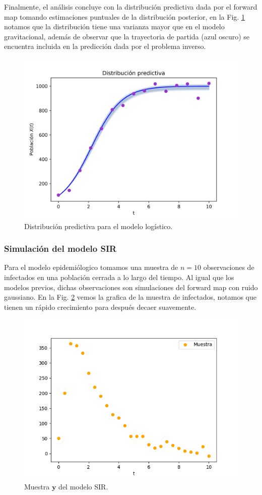 Finalmente, el análisis concluye con la distribución predictiva dada por el forward map tomando estimaciones puntuales de la distribución posterior, en la Fig. \ref{Fig. 3.2.log.predictiva} notamos que la distribución tiene una varianza mayor que en el modelo gravitacional, además de observar que la trayectoria de partida (azul oscuro) se encuentra incluida en la predicción dada por el problema inverso.

\begin{figure}
    \centering 
    \includegraphics[width = 10 cm ]{img/Exp_Central_logistico_sigma/Figuras/Generales/Predictiva_logistico_sigma.png} 
    \caption{Distribución predictiva para el modelo logístico.}
    \label{Fig. 3.2.log.predictiva}
\end{figure} 

\subsubsection{Simulación del modelo SIR}

Para el modelo epidemiólogico tomamos una muestra de $n =10$ observaciones de infectados en una población cerrada a lo largo del tiempo. Al igual que los modelos previos, dichas observaciones son simulaciones del forward map con ruido gaussiano. En la Fig. \ref{Fig. SIR_01} vemos la grafica de la muestra de infectados, notamos que tienen un rápido crecimiento para después decaer suavemente.

\begin{figure}
    \centering 
    \includegraphics[width = 10 cm]{img/Exp_Central_SIR_sigma/Figuras/Generales/Muestra_SIR_sigma.png} 
    \caption{Muestra $\mathbf{y}$ del modelo SIR.}
    \label{Fig. SIR_01}
\end{figure} 


